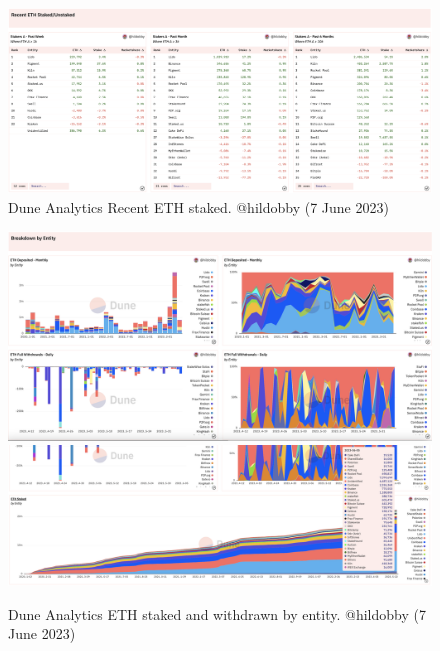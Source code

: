 \documentclass[UTF8]{article}
\begin{document}
{\begin{figure}[htbp]
\begin{center}
\includegraphics[width=\linewidth]{images/hildobby5}
\caption{Dune Analytics Recent ETH staked. @hildobby  (7 June 2023)}
\label{fig:hildobby5}
\end{center}
\end{figure}

\begin{figure}[htbp]
\begin{center}
\includegraphics[width=\linewidth]{images/hildobby6}\\
\includegraphics[width=\linewidth]{images/hildobby7}
\caption{Dune Analytics ETH staked and withdrawn by entity. @hildobby  (7 June 2023)}
\label{fig:hildobby6}
\end{center}
\end{figure}

}
\end{document}

